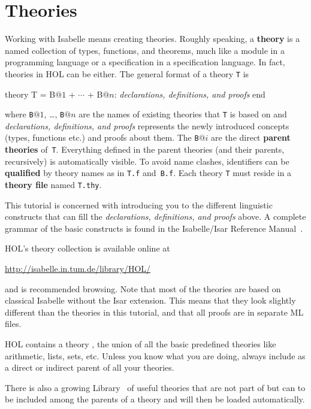 \section{Theories}
\label{sec:Basic:Theories}

%
Working with Isabelle means creating theories. Roughly speaking, a
\textbf{theory} is a named collection of types, functions, and theorems,
much like a module in a programming language or a specification in a
specification language. In fact, theories in HOL can be either. The general
format of a theory \texttt{T} is
\begin{ttbox}
theory T = B\(@1\) + \(\cdots\) + B\(@n\):
{\rmfamily\textit{declarations, definitions, and proofs}}
end
\end{ttbox}
where \texttt{B}$@1$, \dots, \texttt{B}$@n$ are the names of existing
theories that \texttt{T} is based on and \textit{declarations,
    definitions, and proofs} represents the newly introduced concepts
(types, functions etc.) and proofs about them. The \texttt{B}$@i$ are the
direct \textbf{parent theories} of~\texttt{T}\@.
Everything defined in the parent theories (and their parents, recursively) is
automatically visible. To avoid name clashes, identifiers can be
\textbf{qualified}
by theory names as in \texttt{T.f} and~\texttt{B.f}. 
Each theory \texttt{T} must
reside in a \textbf{theory file} named \texttt{T.thy}.

This tutorial is concerned with introducing you to the different linguistic
constructs that can fill the \textit{declarations, definitions, and
    proofs} above.  A complete grammar of the basic
constructs is found in the Isabelle/Isar Reference
Manual~\cite{isabelle-isar-ref}.

HOL's theory collection is available online at
\begin{center}\small
    \url{http://isabelle.in.tum.de/library/HOL/}
\end{center}
and is recommended browsing. Note that most of the theories 
are based on classical Isabelle without the Isar extension. This means that
they look slightly different than the theories in this tutorial, and that all
proofs are in separate ML files.

\begin{warn}
  HOL contains a theory , the union of all the basic
  predefined theories like arithmetic, lists, sets, etc.  
  Unless you know what you are doing, always include 
  as a direct or indirect parent of all your theories.
\end{warn}
There is also a growing Library~\cite{HOL-Library}
of useful theories that are not part of  but can to be included
among the parents of a theory and will then be loaded automatically.%


